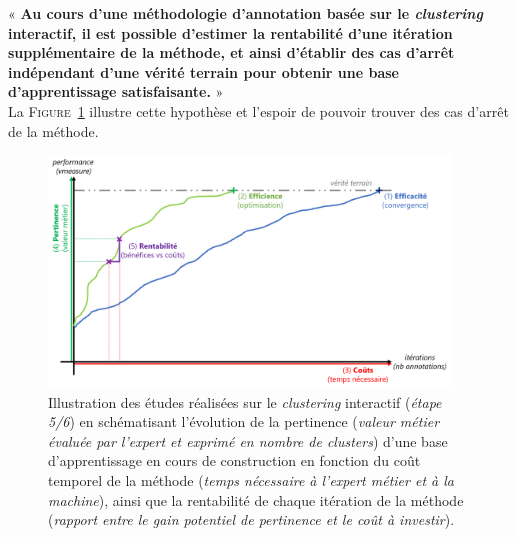 	\begin{tcolorbox}[
		title=\faVial~\textbf{Hypothèse de rentabilité}~\faVial,
		colback=colorTcolorboxHypothesis!15,
		colframe=colorTcolorboxHypothesis!75,
		width=\linewidth
	]
		« \textbf{
			Au cours d'une méthodologie d'annotation basée sur le \textit{clustering} interactif, il est possible d'estimer la rentabilité d'une itération supplémentaire de la méthode, et ainsi d'établir des cas d'arrêt indépendant d'une vérité terrain pour obtenir une base d’apprentissage satisfaisante.
		} » \\
		
		La \textsc{Figure~\ref{figure:4.5-HYPOTHESE-RENTABILITE}} illustre cette hypothèse et l'espoir de pouvoir trouver des cas d'arrêt de la méthode.
		\begin{figure}[H]  %
			\centering
			\includegraphics[width=0.95\textwidth]{figures/hypotheses-05-rentabilite}
			\caption{Illustration des études réalisées sur le \textit{clustering} interactif (\textit{étape 5/6}) en schématisant l'évolution de la pertinence (\textit{valeur métier évaluée par l'expert et exprimé en nombre de clusters}) d'une base d'apprentissage en cours de construction en fonction du coût temporel de la méthode (\textit{temps nécessaire à l'expert métier et à la machine}), ainsi que la rentabilité de chaque itération de la méthode (\textit{rapport entre le gain potentiel de pertinence et le coût à investir}).}
			\label{figure:4.5-HYPOTHESE-RENTABILITE}
		\end{figure}

	\end{tcolorbox}
		
